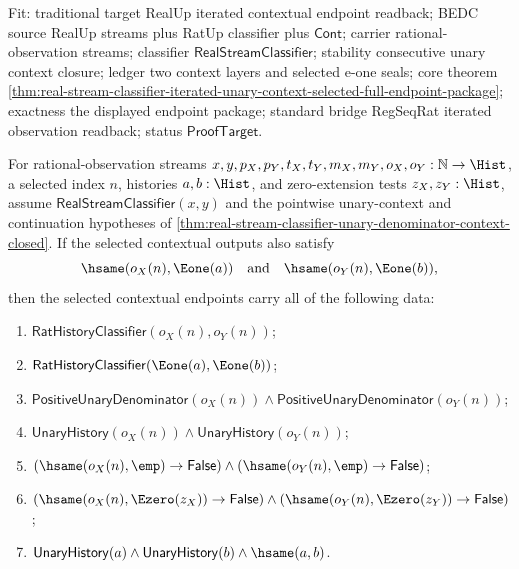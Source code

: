 Fit: traditional target RealUp iterated contextual endpoint readback; BEDC
source RealUp streams plus RatUp classifier plus $\mathsf{Cont}$; carrier
rational-observation streams; classifier $\mathsf{RealStreamClassifier}$;
stability consecutive unary context closure; ledger two context layers and
selected e-one seals; core theorem
\autoref{thm:real-stream-classifier-iterated-unary-context-selected-full-endpoint-package};
exactness the displayed endpoint package; standard bridge RegSeqRat iterated
observation readback; status $\mathsf{ProofTarget}$.

\begin{theorem}
\label{thm:real-stream-classifier-unary-denominator-context-selected-classifier-full-endpoint-package}
For rational-observation streams
$x,y,p_X,p_Y,t_X,t_Y,m_X,m_Y,o_X,o_Y:\mathbb{N}\to\Hist$, a selected
index $n$, histories $a,b:\Hist$, and zero-extension tests $z_X,z_Y:\Hist$,
assume $\mathsf{RealStreamClassifier}(x,y)$ and the pointwise unary-context
and continuation hypotheses of
\autoref{thm:real-stream-classifier-unary-denominator-context-closed}. If the
selected contextual outputs also satisfy
$$
\hsame(o_X(n),\Eone(a))\quad\text{and}\quad \hsame(o_Y(n),\Eone(b)),
$$
then the selected contextual endpoints carry all of the following data:
\begin{enumerate}
\item $\mathsf{RatHistoryClassifier}(o_X(n),o_Y(n))$;
\item $\mathsf{RatHistoryClassifier}(\Eone(a),\Eone(b))$;
\item $\mathsf{PositiveUnaryDenominator}(o_X(n))\land
\mathsf{PositiveUnaryDenominator}(o_Y(n))$;
\item $\mathsf{UnaryHistory}(o_X(n))\land \mathsf{UnaryHistory}(o_Y(n))$;
\item $(\hsame(o_X(n),\emp)\to\mathsf{False})\land
(\hsame(o_Y(n),\emp)\to\mathsf{False})$;
\item $(\hsame(o_X(n),\Ezero(z_X))\to\mathsf{False})\land
(\hsame(o_Y(n),\Ezero(z_Y))\to\mathsf{False})$;
\item $\mathsf{UnaryHistory}(a)\land\mathsf{UnaryHistory}(b)\land\hsame(a,b)$.
\end{enumerate}
\end{theorem}
